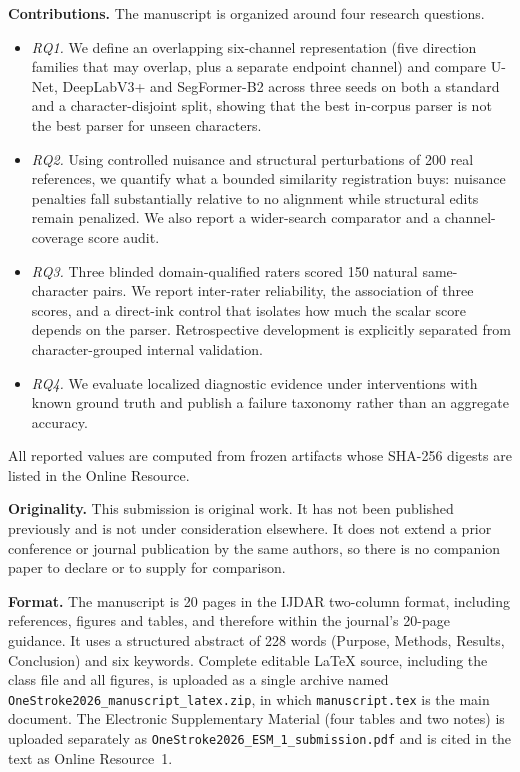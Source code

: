\documentclass[11pt,a4paper]{article}
\begin{document}
\textbf{Contributions.} The manuscript is organized around four research
questions.
\begin{itemize}
  \item \emph{RQ1.} We define an overlapping six-channel representation
  (five direction families that may overlap, plus a separate endpoint
  channel) and compare U-Net, DeepLabV3+ and SegFormer-B2 across three seeds
  on both a standard and a character-disjoint split, showing that the best
  in-corpus parser is not the best parser for unseen characters.
  \item \emph{RQ2.} Using controlled nuisance and structural perturbations of
  200 real references, we quantify what a bounded similarity registration
  buys: nuisance penalties fall substantially relative to no alignment while
  structural edits remain penalized. We also report a wider-search
  comparator and a channel-coverage score audit.
  \item \emph{RQ3.} Three blinded domain-qualified raters scored 150 natural
  same-character pairs. We report inter-rater reliability, the association of
  three scores, and a direct-ink control that isolates how much the scalar
  score depends on the parser. Retrospective development is explicitly
  separated from character-grouped internal validation.
  \item \emph{RQ4.} We evaluate localized diagnostic evidence under
  interventions with known ground truth and publish a failure taxonomy
  rather than an aggregate accuracy.
\end{itemize}
All reported values are computed from frozen artifacts whose SHA-256 digests
are listed in the Online Resource.

\textbf{Originality.} This submission is original work. It has not been
published previously and is not under consideration elsewhere. It does not
extend a prior conference or journal publication by the same authors, so
there is no companion paper to declare or to supply for comparison.

\textbf{Format.} The manuscript is 20 pages in the IJDAR two-column format,
including references, figures and tables, and therefore within the journal's
20-page guidance. It uses a structured abstract of 228 words (Purpose,
Methods, Results, Conclusion) and six keywords. Complete editable LaTeX
source, including the class file and all figures, is uploaded as a single
archive named \texttt{OneStroke2026\_manuscript\_latex.zip}, in which
\texttt{manuscript.tex} is the main document. The Electronic Supplementary
Material (four tables and two notes) is uploaded separately as
\texttt{OneStroke2026\_ESM\_1\_submission.pdf} and is cited in the text as
Online Resource~1.
\end{document}
